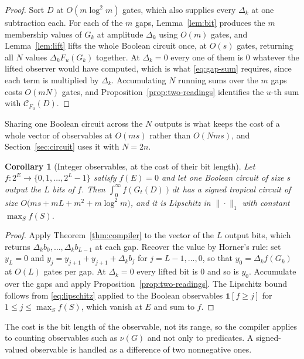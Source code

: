 \documentclass[11pt]{article}
\newtheorem{corollary}[theorem]{Corollary}
\begin{document}
\begin{proof}
Sort $D$ at $O(m\log^{2}m)$ gates, which also supplies every $\Delta_k$ at one
subtraction each.  For each of the $m$ gaps, Lemma~\ref{lem:bit} produces the
$m$ membership values of $G_k$ at amplitude $\Delta_k$ using $O(m)$ gates, and
Lemma~\ref{lem:lift} lifts the whole Boolean circuit once, at $O(s)$ gates,
returning all $N$ values $\Delta_kF_u(G_k)$ together.  At $\Delta_k=0$ every one
of them is $0$ whatever the lifted observer would have computed, which is what
\eqref{eq:gap-sum} requires, since each term is multiplied by $\Delta_k$.
Accumulating $N$ running sums over the $m$ gaps costs $O(mN)$ gates, and
Proposition~\ref{prop:two-readings} identifies the $u$-th sum with
$\mathcal C_{F_u}(D)$.
\end{proof}

Sharing one Boolean circuit across the $N$ outputs is what keeps the cost of a
whole vector of observables at $O(ms)$ rather than $O(Nms)$, and
Section~\ref{sec:circuit} uses it with $N=2n$.

\begin{corollary}[Integer observables, at the cost of their bit length]
\label{cor:integer-observable}
Let $f\colon2^{E}\to\{0,1,\ldots,2^{L}-1\}$ satisfy $f(E)=0$ and let one Boolean
circuit of size $s$ output the $L$ bits of $f$.  Then
$\int_0^{\infty}f(G_t(D))\,dt$ has a signed tropical circuit of size
$O\bigl(ms+mL+m^{2}+m\log^{2}m\bigr)$, and it is Lipschitz in $\|\cdot\|_1$ with
constant $\max_S f(S)$.
\end{corollary}

\begin{proof}
Apply Theorem~\ref{thm:compiler} to the vector of the $L$ output bits, which
returns $\Delta_kb_0,\ldots,\Delta_kb_{L-1}$ at each gap.  Recover the value by
Horner's rule: set $y_L=0$ and $y_j=y_{j+1}+y_{j+1}+\Delta_kb_j$ for
$j=L-1,\ldots,0$, so that $y_0=\Delta_kf(G_k)$ at $O(L)$ gates per gap.  At
$\Delta_k=0$ every lifted bit is $0$ and so is $y_0$.  Accumulate over the gaps
and apply Proposition~\ref{prop:two-readings}.  The Lipschitz bound follows from
\eqref{eq:lipschitz} applied to the Boolean observables $\mathbf1[f\ge j]$ for
$1\le j\le\max_Sf(S)$, which vanish at $E$ and sum to $f$.
\end{proof}

The cost is the bit length of the observable, not its range, so the compiler
applies to counting observables such as $\nu(G)$ and not only to predicates.
A signed-valued observable is handled as a difference of two nonnegative ones.
\end{document}
